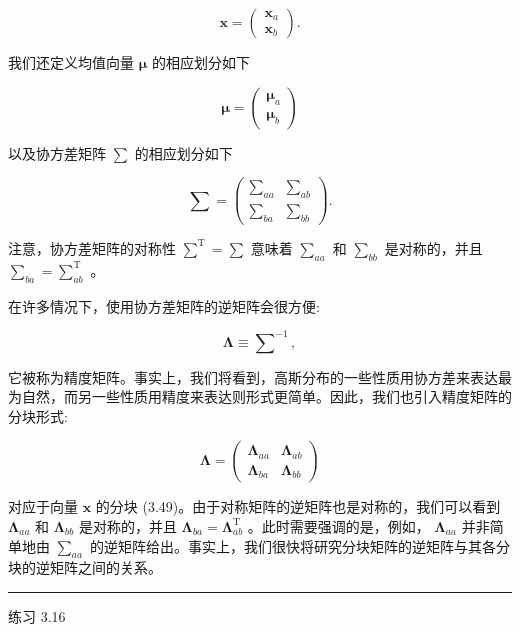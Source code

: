 \documentclass[10pt]{report}
\newcommand{\HRule}{\begin{center}\rule{0.9\linewidth}{0.2mm}\end{center}}
\begin{document}
\[
\mathbf{x} = \left( \begin{array}{l} {\mathbf{x}}_{a} \\  {\mathbf{x}}_{b} \end{array}\right) . \tag{3.49}
\]

我们还定义均值向量 \(\mathbf{\mu }\) 的相应划分如下

\[
\mathbf{\mu } = \left( \begin{array}{l} {\mathbf{\mu }}_{a} \\  {\mathbf{\mu }}_{b} \end{array}\right)  \tag{3.50}
\]

以及协方差矩阵 \(\mathbf{\sum }\) 的相应划分如下

\[
\mathbf{\sum } = \left( \begin{array}{ll} {\mathbf{\sum }}_{aa} & {\mathbf{\sum }}_{ab} \\  {\mathbf{\sum }}_{ba} & {\mathbf{\sum }}_{bb} \end{array}\right) . \tag{3.51}
\]

注意，协方差矩阵的对称性 \({\mathbf{\sum }}^{\mathrm{T}} = \mathbf{\sum }\) 意味着 \({\mathbf{\sum }}_{aa}\) 和 \({\mathbf{\sum }}_{bb}\) 是对称的，并且 \({\mathbf{\sum }}_{ba} = {\mathbf{\sum }}_{ab}^{\mathrm{T}}\) 。

在许多情况下，使用协方差矩阵的逆矩阵会很方便:

\[
\mathbf{\Lambda } \equiv  {\mathbf{\sum }}^{-1}, \tag{3.52}
\]

它被称为精度矩阵。事实上，我们将看到，高斯分布的一些性质用协方差来表达最为自然，而另一些性质用精度来表达则形式更简单。因此，我们也引入精度矩阵的分块形式:

\[
\mathbf{\Lambda } = \left( \begin{array}{ll} {\mathbf{\Lambda }}_{aa} & {\mathbf{\Lambda }}_{ab} \\  {\mathbf{\Lambda }}_{ba} & {\mathbf{\Lambda }}_{bb} \end{array}\right)  \tag{3.53}
\]

对应于向量 \(\mathbf{x}\) 的分块 (3.49)。由于对称矩阵的逆矩阵也是对称的，我们可以看到 \({\mathbf{\Lambda }}_{aa}\) 和 \({\mathbf{\Lambda }}_{bb}\) 是对称的，并且 \({\mathbf{\Lambda }}_{ba} = {\mathbf{\Lambda }}_{ab}^{\mathrm{T}}\) 。此时需要强调的是，例如， \({\mathbf{\Lambda }}_{aa}\) 并非简单地由 \({\mathbf{\sum }}_{aa}\) 的逆矩阵给出。事实上，我们很快将研究分块矩阵的逆矩阵与其各分块的逆矩阵之间的关系。

\HRule

练习 3.16
\end{document}
